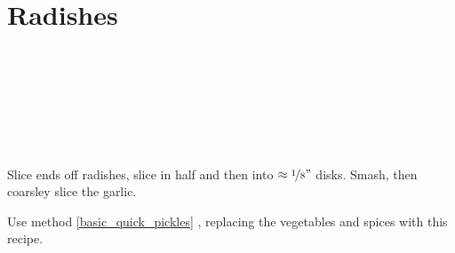 \section{Radishes}

\begin{ingredientcolumns}[1]
	\begin{ingredientblock}
		\\
		\\
		\\
		\\
		\\
		\\
	\end{ingredientblock}
\end{ingredientcolumns}


\begin{preparation}
\item Slice ends off radishes, slice in half and then into $\approx \nicefrac{1}{8} "$ disks.
	Smash, then coarsley slice the garlic.

\item Use method \ref{basic_quick_pickles} , replacing the vegetables and spices with this recipe.
\end{preparation}


\recipeend
